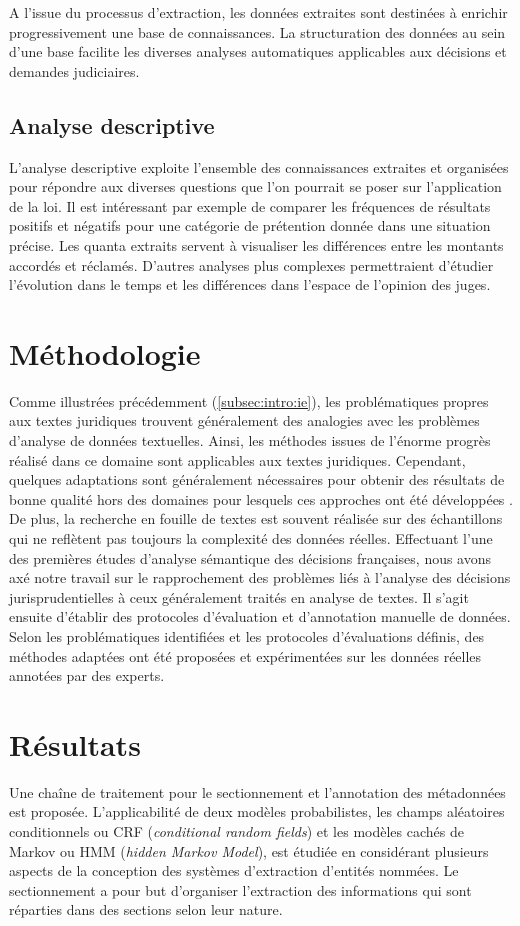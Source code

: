 A l'issue du processus d'extraction, les données extraites sont destinées à enrichir progressivement une base de connaissances. La structuration des données au sein d'une base facilite les diverses analyses automatiques applicables aux décisions et demandes judiciaires. 

\subsection{Analyse descriptive}
L'analyse descriptive exploite l'ensemble des connaissances extraites et organisées pour répondre aux diverses questions que l'on pourrait se poser sur l'application de la loi. Il est intéressant par exemple de comparer les fréquences de résultats positifs et négatifs pour une catégorie de prétention donnée dans une situation précise. Les quanta extraits servent à visualiser les différences entre les montants accordés et réclamés. D'autres analyses plus complexes permettraient d'étudier l'évolution dans le temps et les différences dans l'espace de l'opinion des juges.


\section{Méthodologie}
\label{sec:intro:methodologie}

Comme illustrées précédemment (\ref{subsec:intro:ie}), les problématiques propres aux textes juridiques trouvent généralement des analogies avec les problèmes d'analyse de données textuelles. Ainsi, les méthodes issues de l'énorme progrès réalisé dans ce domaine sont applicables aux textes juridiques. Cependant, quelques adaptations sont généralement nécessaires pour obtenir des résultats de bonne qualité hors des domaines pour lesquels ces approches ont été développées \citep{Waltl2016lexia}. De plus, la recherche en fouille de textes est souvent réalisée sur des échantillons qui ne reflètent pas toujours la complexité des données réelles. Effectuant l'une des premières études d'analyse sémantique des décisions françaises, nous avons axé notre travail sur le rapprochement des problèmes liés à l'analyse des décisions jurisprudentielles à ceux généralement traités en analyse de textes. Il s'agit ensuite d'établir des protocoles d'évaluation et d'annotation manuelle de données. Selon les problématiques identifiées et les protocoles d'évaluations définis, des méthodes adaptées ont été proposées et expérimentées sur les données réelles annotées par des experts.

\section{Résultats}
\label{sec:intro:résultats}
Une chaîne de traitement pour le sectionnement et l'annotation des métadonnées est proposée. L'applicabilité de deux modèles probabilistes, les champs aléatoires conditionnels ou CRF (\textit{conditional random fields}) et les modèles cachés de Markov ou HMM (\textit{hidden Markov Model}), est étudiée en considérant plusieurs aspects de la conception des systèmes d'extraction d'entités nommées. Le sectionnement a pour but d'organiser l'extraction des informations qui sont réparties dans des sections selon leur nature. 

